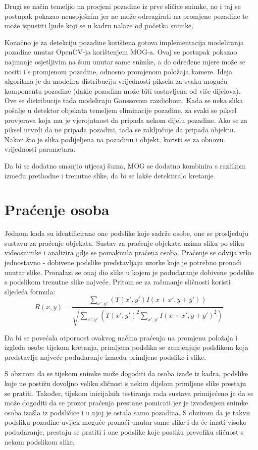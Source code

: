 \documentclass[utf8, seminar, numeric, times]{fer}
\begin{document}
Drugi se način temeljio na procjeni pozadine iz prve sličice snimke, no i taj se postupak pokazao neuspješnim jer ne može odreagirati na promjene pozadine te može ispustiti ljude koji se u kadru nalaze od početka snimke. 

Konačno je za detekciju pozadine korištena gotova implementacija modeliranja pozadine unutar OpenCV-ja korištenjem MOG-a. Ovaj se postupak pokazao najmanje osjetljivim na šum unutar same snimke, a do određene mjere može se nositi i s promjenom pozadine, odnosno promjenom položaja kamere. Ideja algoritma je da modelira distribuciju vrijednosti piksela za svaku moguću komponentu pozadine (dakle pozadina može biti sastavljena od više dijelova). Ove se distribucije tada modeliraju Gaussovom razdiobom. Kada se neka slika pošalje u detektor objekata temeljem eliminacije pozadine, za svaki se piksel provjerava koja mu je vjerojatnost da pripada nekom dijelu pozadine. Ako se za piksel utvrdi da ne pripada pozadini, tada se zaključuje da pripada objektu. Nakon što je slika podijeljena na pozadinu i objekt, koristi se za obnovu vrijednosti parametara.

Da bi se dodatno smanjio utjecaj šuma, MOG se dodatno kombinira s razlikom između prethodne i trenutne slike, da bi se lakše detektiralo kretanje.

\section{Praćenje osoba}
Jednom kada su identificirane one podslike koje sadrže osobe, one se prosljeđuju sustavu za praćenje objekata. Sustav za praćenje objekata uzima sliku po sliku videosnimke i analizira gdje se pomaknula praćena osoba. Praćenje se odvija vrlo jednostavno - dobivene podslike predstavljaju uzorke koje je potrebno pronaći unutar slike. Pronalazi se onaj dio slike u kojem je podudaranje dobivene podslike s podslikom trenutne slike najveće. Pritom se za računanje sličnosti koristi sljedeća formula:
\begin{equation}
R(x,y)=\frac{ \sum_{x',y'}(T(x',y')I(x + x', y+y'))}{\sqrt{\sum_{x',y'}(T(x',y')^2\sum_{x',y'}I(x + x', y+y')^2)}}
\end{equation}

Da bi se povećala otpornost ovakvog načina praćenja na promjenu položaja i izgleda osobe tijekom kretanja, primljena podslika se zamjenjuje podslikom koja predstavlja najveće podudaranje između primljene podslike i slike.

S obzirom da se tijekom snimke može dogoditi da osoba izađe iz kadra, podslike koje ne postižu dovoljno veliku sličnost s nekim dijelom primljene slike prestaju se pratiti. Također, tijekom inicijalnih testiranja rada sustava primijećeno je da se može dogoditi da se prozor praćenja prestane pomicati jer je izvođenjem snimke osoba izašla iz podsličice i u njoj je ostala samo pozadina. S obzirom da je takvu podsliku pozadine uvijek moguće pronaći unutar same slike i da će imati visoko podudaranje, prestaju se pratiti i one podslike koje postižu preveliku sličnost s nekom podslikom slike.
\end{document}
